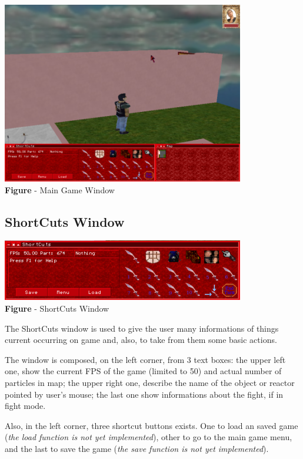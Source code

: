 \documentclass[ letterpaper,12pt]{article}
\begin{document}
\begin{center}
  \includegraphics{mainGame.png}
\\{\bf Figure} - Main Game Window
\end{center}

\subsection{ShortCuts Window}

\begin{center}
  \includegraphics{shortcutsWindow.png}
\\{\bf Figure} - ShortCuts Window
\end{center}

The ShortCuts window is used to give the user many informations of things current occurring on game and, also, to take from them some basic actions.

The window is composed, on the left corner, from 3 text boxes: the upper left one, show the current FPS of the game (limited to 50) and actual number of particles in map; the upper right one, describe the name of the object or reactor pointed by user's mouse; the last one show informations about the fight, if in fight mode.

Also, in the left corner, three shortcut buttons exists. One to load an saved game ({\it the load function is not yet implemented}), other to go to the main game menu, and the last to save the game ({\it the save function is not yet implemented}).
\end{document}
